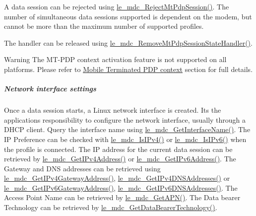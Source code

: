 A data session can be rejected using \hyperlink{le__mdc__interface_8h_ae3b49edad910960b84a9012ecc33c66a}{le\+\_\+mdc\+\_\+\+Reject\+Mt\+Pdp\+Session()}. The number of simultaneous data sessions supported is dependent on the modem, but cannot be more than the maximum number of supported profiles.

The handler can be released using \hyperlink{le__mdc__interface_8h_a68b03606241ea2215e076966a7c08d99}{le\+\_\+mdc\+\_\+\+Remove\+Mt\+Pdp\+Session\+State\+Handler()}.

\begin{DoxyWarning}{Warning}
The M\+T-\/\+P\+DP context activation feature is not supported on all platforms. Please refer to \hyperlink{platformConstraintsMdc_MT-PDP_context}{Mobile Terminated P\+DP context} section for full details.
\end{DoxyWarning}
\hypertarget{c_mdc_le_mdc_session_networkItf}{}\subparagraph{Network interface settings}\label{c_mdc_le_mdc_session_networkItf}
Once a data session starts, a Linux network interface is created. It\textquotesingle{}s the application\textquotesingle{}s responsibility to configure the network interface, usually through a D\+H\+CP client. Query the interface name using \hyperlink{le__mdc__interface_8h_a4c22a8691d6e6a69270a7ed6ab9974af}{le\+\_\+mdc\+\_\+\+Get\+Interface\+Name()}. The IP Preference can be checked with \hyperlink{le__mdc__interface_8h_aa3912e94864a6e5862e07f58b3772cba}{le\+\_\+mdc\+\_\+\+Is\+I\+Pv4()} or \hyperlink{le__mdc__interface_8h_adde11de0b17b2c937acca6355b6fba11}{le\+\_\+mdc\+\_\+\+Is\+I\+Pv6()} when the profile is connected. The IP address for the current data session can be retrieved by \hyperlink{le__mdc__interface_8h_a0b5e11efda06472fc6c525101fceafe6}{le\+\_\+mdc\+\_\+\+Get\+I\+Pv4\+Address()} or \hyperlink{le__mdc__interface_8h_a73ef38d4d2399580d552b12c62f1c508}{le\+\_\+mdc\+\_\+\+Get\+I\+Pv6\+Address()}. The Gateway and D\+NS addresses can be retrieved using \hyperlink{le__mdc__interface_8h_a290cff563b19ee4891bcd5c8908c54f9}{le\+\_\+mdc\+\_\+\+Get\+I\+Pv4\+Gateway\+Address()}, \hyperlink{le__mdc__interface_8h_a0dd0dcf60d647388fa3e1973917a6161}{le\+\_\+mdc\+\_\+\+Get\+I\+Pv4\+D\+N\+S\+Addresses()} or \hyperlink{le__mdc__interface_8h_a3bb60671304e2b4d3b23d8e623f9940c}{le\+\_\+mdc\+\_\+\+Get\+I\+Pv6\+Gateway\+Address()}, \hyperlink{le__mdc__interface_8h_ad9cb7d3299620d9dcde551cec45389a1}{le\+\_\+mdc\+\_\+\+Get\+I\+Pv6\+D\+N\+S\+Addresses()}. The Access Point Name can be retrieved by \hyperlink{le__mdc__interface_8h_afc0c149bfa4455f3e9a8ccc06f0c5fed}{le\+\_\+mdc\+\_\+\+Get\+A\+P\+N()}. The Data bearer Technology can be retrieved by \hyperlink{le__mdc__interface_8h_a1b17bb87b347162013b5ad608cdcda2d}{le\+\_\+mdc\+\_\+\+Get\+Data\+Bearer\+Technology()}.

